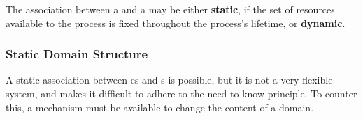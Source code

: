 The association between a  and a  may be either \textbf{static}, if the set of resources available to the process is fixed throughout the process’s lifetime, or \textbf{dynamic}.

\subsubsection{Static Domain Structure}\label{subsubsec:Static_Domain_Structure}
A static association between es and s is possible, but it is not a very flexible system, and makes it difficult to adhere to the need-to-know principle.
To counter this, a mechanism must be available to change the content of a domain.

